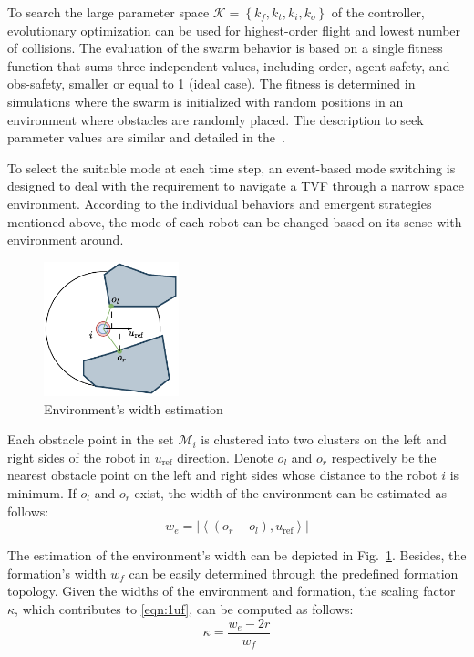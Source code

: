 To search the large parameter space $\mathcal{K}=\left\{k_f,k_t,k_i,k_o\right\}$ of the controller, evolutionary optimization can be used for highest-order flight and lowest number of collisions. The evaluation of the swarm behavior is based on a single fitness function that sums three independent values, including order, agent-safety, and obs-safety, smaller or equal to 1 (ideal case). The fitness is determined in simulations where the swarm is initialized with random positions in an environment where obstacles are  randomly placed. The description  to seek parameter values are similar and detailed in the~\cite{Vsrhelyi2018}.

To select the suitable mode at each time step, an event-based mode switching is designed to deal with the requirement to navigate a TVF through a narrow space environment. According to the individual behaviors and emergent strategies mentioned above, the mode of each robot can be changed based on its sense with environment around.

\begin{figure}
    \centering
    \includegraphics[width=0.35\textwidth]{paper2/images/we.pdf}
    \caption{Environment's width estimation}
    \label{fig:1we}
\end{figure}

Each obstacle point in the set $\mathcal{M}_{i}$ is clustered into two clusters on the left and right sides of the robot in $u_\text{ref}$ direction. Denote $o_l$ and $o_r$ respectively be the nearest obstacle point on the left and right sides whose distance to the robot $i$ is minimum. If $o_l$ and $o_r$ exist, the width of the environment can be estimated as follows:
\begin{equation}
    w_e= \left\vert\left\langle\left(o_r-o_l\right),u_\text{ref}\right\rangle\right\vert
    \label{eqn:1we}
\end{equation}

The estimation of the environment's width can be depicted in Fig.~\ref{fig:1we}. Besides, the formation's width $w_f$ can be easily determined through the predefined formation topology. Given the widths of the environment and formation, the scaling factor $\kappa$, which contributes to \eqref{eqn:1uf}, can be computed as follows:
\begin{equation}
    \kappa=\dfrac{w_e-2r}{w_f}
    \label{eqn:1kappa}
\end{equation}

